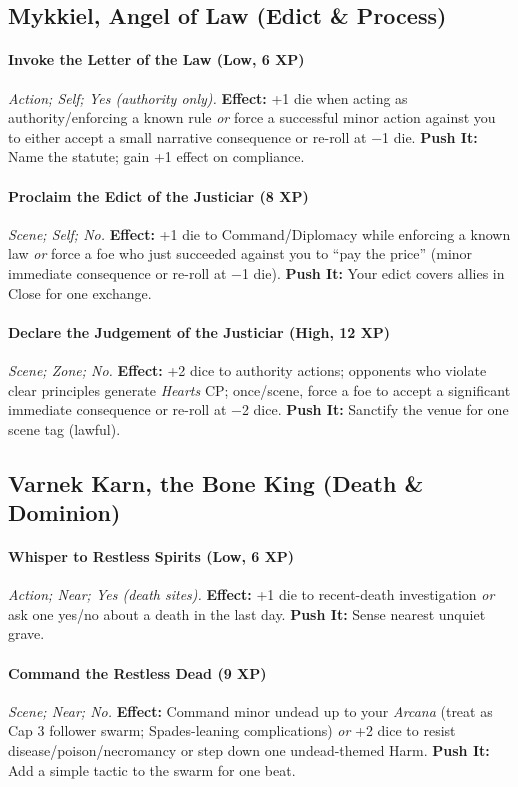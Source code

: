 \documentclass[12pt,twoside]{book}
\begin{document}
\subsection{Mykkiel, Angel of Law (Edict \& Process)}
\paragraph{Invoke the Letter of the Law (Low, 6 XP)} \emph{Action; Self; Yes (authority only).}
\textbf{Effect:} +1 die when acting as authority/enforcing a known rule \emph{or} force a successful minor action against you to either accept a small narrative consequence or re-roll at −1 die.
\textbf{Push It:} Name the statute; gain +1 effect on compliance.
\paragraph{Proclaim the Edict of the Justiciar (8 XP)} \emph{Scene; Self; No.}
\textbf{Effect:} +1 die to Command/Diplomacy while enforcing a known law \emph{or} force a foe who just succeeded against you to ``pay the price'' (minor immediate consequence or re-roll at −1 die).
\textbf{Push It:} Your edict covers allies in Close for one exchange.
\paragraph{Declare the Judgement of the Justiciar (High, 12 XP)} \emph{Scene; Zone; No.}
\textbf{Effect:} +2 dice to authority actions; opponents who violate clear principles generate \emph{Hearts} CP; once/scene, force a foe to accept a significant immediate consequence or re-roll at −2 dice.
\textbf{Push It:} Sanctify the venue for one scene tag (lawful).

\subsection{Varnek Karn, the Bone King (Death \& Dominion)}
\paragraph{Whisper to Restless Spirits (Low, 6 XP)} \emph{Action; Near; Yes (death sites).}
\textbf{Effect:} +1 die to recent-death investigation \emph{or} ask one yes/no about a death in the last day.
\textbf{Push It:} Sense nearest unquiet grave.
\paragraph{Command the Restless Dead (9 XP)} \emph{Scene; Near; No.}
\textbf{Effect:} Command minor undead up to your \emph{Arcana} (treat as Cap 3 follower swarm; Spades-leaning complications) \emph{or} +2 dice to resist disease/poison/necromancy or step down one undead-themed Harm.
\textbf{Push It:} Add a simple tactic to the swarm for one beat.
\end{document}
